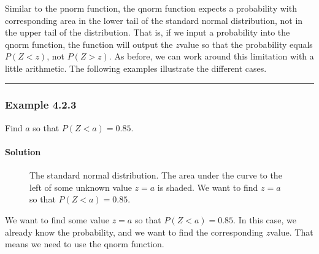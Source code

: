 \documentclass[letterpaper,10pt,english]{jupyterBook}
\begin{document}
\sphinxAtStartPar
Similar to the pnorm function, the qnorm function expects a probability with corresponding area in the lower tail of the standard normal distribution, not in the upper tail of the distribution. That is, if we input a probability into the qnorm function, the function will output the \(z\)\sphinxhyphen{}value so that the probability equals \(P(Z < z)\), not \(P(Z > z)\). As before, we can work around this limitation with a little arithmetic. The following examples illustrate the different cases.


\bigskip\hrule\bigskip



\subsubsection{Example 4.2.3}
\label{\detokenize{Ch4 The Normal Distribution and the Central Limit Theorem/4.2 The Standard Normal Distribution:example-4-2-3}}
\sphinxAtStartPar
Find \(a\) so that \(P(Z < a) = 0.85\).


\paragraph{Solution}
\label{\detokenize{Ch4 The Normal Distribution and the Central Limit Theorem/4.2 The Standard Normal Distribution:id6}}
\begin{figure}[htbp]
\centering
\capstart

\noindent{}
\caption{The standard normal distribution. The area under the curve to the left of some unknown value \(z = a\) is shaded. We want to find \(z = a\) so that \(P(Z < a) = 0.85\).}\label{\detokenize{Ch4 The Normal Distribution and the Central Limit Theorem/4.2 The Standard Normal Distribution:stdnormal-ex4}}\end{figure}

\sphinxAtStartPar
We want to find some value \(z = a\) so that \(P(Z < a) = 0.85\). In this case, we already know the probability, and we want to find the corresponding \(z\)\sphinxhyphen{}value. That means we need to use the qnorm function.
\end{document}
